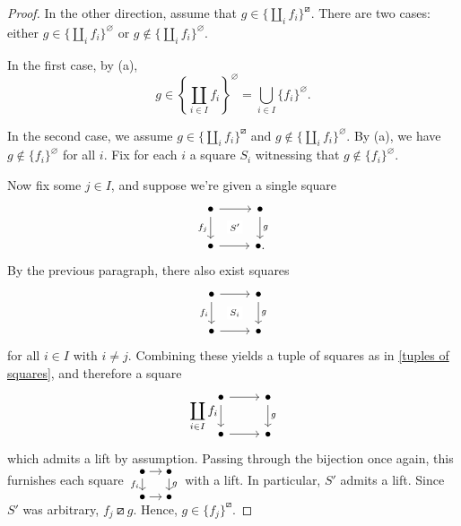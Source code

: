 \documentclass{amsart}
\renewcommand\emptyset\varnothing
\newcommand{\rlp}[1]{{#1}^{\boxslash}}
\numberwithin{equation}{section}
\theoremstyle{definition}
\begin{document}
\begin{proof}
	\medskip

	In the other direction, assume that $g \in \rlp{\{\coprod_i f_i\}}$. There are two cases: either $g \in \{\coprod_i f_i\}^\emptyset$ or $g \not \in \{\coprod_i f_i\}^\emptyset$.

	In the first case, by (a),
	\begin{equation}
		\label{coprod vacuous is union of individual vacuous}
		g \in \left\{\coprod_{i \in I} f_i\right\}^\emptyset = \bigcup_{i \in I} \{f_i\}^\emptyset.
	\end{equation}

	In the second case, we assume $g \in \rlp{\{\coprod_i f_i\}}$ and $g \not \in \{\coprod_i f_i\}^\emptyset$. By (a), we have $g \notin \{f_i\}^{\emptyset}$ for all $i$. Fix for each $i$ a square $S_i$ witnessing that $g \notin \{f_i\}^\emptyset$.
	
	Now fix some $j \in I$, and suppose we're given a single square
	\[\begin{tikzcd}[ampersand replacement=\&]
			\bullet \& \bullet \\
			\bullet \& \bullet.
			\arrow[from=1-1, to=1-2]
			\arrow["{f_j}"', from=1-1, to=2-1]
			\arrow["g", from=1-2, to=2-2]
			\arrow[from=2-1, to=2-2]
			\arrow["{S'}"{description}, draw=none, from=1-1, to=2-2]
		\end{tikzcd}\]
	By the previous paragraph, there also exist squares
	\[\begin{tikzcd}
			\bullet & \bullet \\
			\bullet & \bullet
			\arrow[from=1-1, to=1-2]
			\arrow[""{name=0, anchor=center, inner sep=0}, "{f_i}"', from=1-1, to=2-1]
			\arrow[""{name=1, anchor=center, inner sep=0}, "g", from=1-2, to=2-2]
			\arrow[from=2-1, to=2-2]
			\arrow["{S_i}"{description}, draw=none, from=0, to=1]
		\end{tikzcd}\]
	for all $i \in I$ with $i \neq j$. Combining these yields a tuple of squares as in \cref{tuples of squares}, and therefore a square
	\[
		\begin{tikzcd}
			\bullet \ar[d, "\displaystyle\coprod_{i \in I} f_i"'] \ar[r] & \bullet \ar[d, "g"] \\
			\bullet \ar[r] & \bullet
		\end{tikzcd}
	\]
	which admits a lift by assumption. Passing through the bijection once again, this furnishes each square
	$\begin{tikzcd}[sep=10, cramped]
			\bullet \ar[r] \ar[d, "f_i"'] & \bullet \ar[d, "g"] \\
			\bullet \ar[r] & \bullet
		\end{tikzcd}
	$
	with a lift. In particular, $S'$ admits a lift. Since $S'$ was arbitrary, $f_j \boxslash g$. Hence, $g \in \rlp{\{f_j\}}$.


\end{proof}
\end{document}

